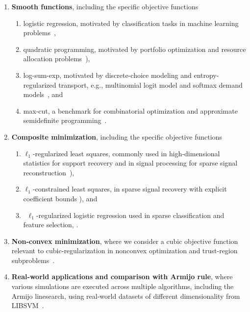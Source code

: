 \documentclass[11pt, a4paper, oneside, reqno]{amsart}
\begin{document}
\begin{enumerate}[leftmargin=8mm, itemsep=1pt, topsep = 0mm]
    \item \textbf{Smooth functions}, including the specific objective functions 
    \begin{enumerate}[label=(\roman*), leftmargin=8mm, itemsep=1pt, topsep = 0mm]
        \item logistic regression, motivated by classification tasks in machine learning problems~\cite{jiang2020online}, 
        
        \item quadratic programming, motivated by portfolio optimization and resource allocation problems~\cite{huang2025restarted, mittal2020robust, mehrotra1990algorithm}),  
        
        \item log-sum-exp, motivated by discrete-choice modeling and entropy-regularized transport, e.g., multinomial logit model and softmax demand models~\cite{feng65technical, qu2025sinkhorn,liu2020assortment}, and 
        
        \item max-cut, a benchmark for combinatorial optimization and approximate semidefinite programming~\cite{boyd1997semidefinite, nesterov2007smoothing, han2025low}. 
    \end{enumerate}
    
    \item \textbf{Composite minimization}, including the specific objective functions 
    
    \begin{enumerate}[label=(\roman*), leftmargin=8mm, itemsep=1pt, topsep = 0mm]
    
    \item $\ell_1$-regularized least squares, commonly used in high-dimensional statistics for support recovery and in signal processing for sparse signal reconstruction~\cite{neykov2016l1, selesnick2017sparse}), 
    
    \item $\ell_1$-constrained least squares,  in sparse signal recovery with explicit coefficient bounds \cite{gaines2018algorithms}), and
    
    \item~$\ell_1$-regularized logistic regression used in sparse classification and feature selection, \cite{bertsimas2021sparse}.
    \end{enumerate}

    \item \textbf{Non-convex minimization}, where we consider a cubic objective function relevant to cubic-regularization in nonconvex optimization and trust-region subproblems~\cite{Nesterov2006, chen2022accelerating}.

    \item {\textbf{Real-world applications and comparison with Armijo rule}, where various simulations are executed across multiple algorithms, including the Armijo linesearch, using real-world datasets of different dimensionality from LIBSVM~\cite{chang2011libsvm}.}
\end{enumerate}
\end{document}
